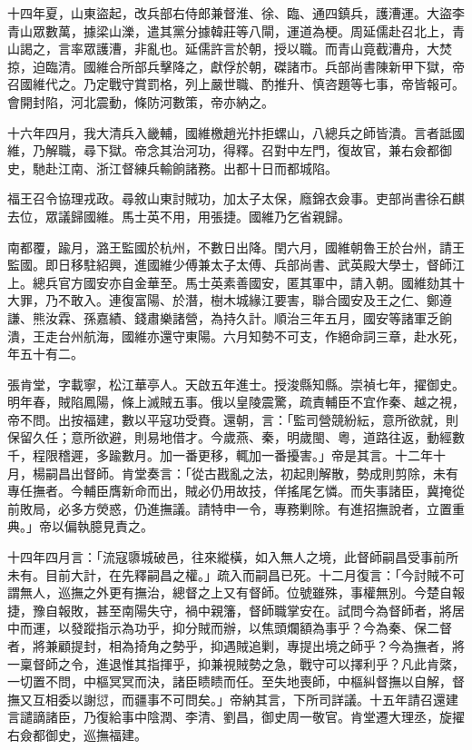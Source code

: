 \begin{pinyinscope}
十四年夏，山東盜起，改兵部右侍郎兼督淮、徐、臨、通四鎮兵，護漕運。大盜李青山眾數萬，據梁山濼，遣其黨分據韓莊等八閘，運道為梗。周延儒赴召北上，青山謁之，言率眾護漕，非亂也。延儒許言於朝，授以職。而青山竟截漕舟，大焚掠，迫臨清。國維合所部兵擊降之，獻俘於朝，磔諸市。兵部尚書陳新甲下獄，帝召國維代之。乃定戰守賞罰格，列上嚴世職、酌推升、慎咨題等七事，帝皆報可。會開封陷，河北震動，條防河數策，帝亦納之。

十六年四月，我大清兵入畿輔，國維檄趙光抃拒螺山，八總兵之師皆潰。言者詆國維，乃解職，尋下獄。帝念其治河功，得釋。召對中左門，復故官，兼右僉都御史，馳赴江南、浙江督練兵輸餉諸務。出都十日而都城陷。

福王召令協理戎政。尋敘山東討賊功，加太子太保，廕錦衣僉事。吏部尚書徐石麒去位，眾議歸國維。馬士英不用，用張捷。國維乃乞省親歸。

南都覆，踰月，潞王監國於杭州，不數日出降。閏六月，國維朝魯王於台州，請王監國。即日移駐紹興，進國維少傅兼太子太傅、兵部尚書、武英殿大學士，督師江上。總兵官方國安亦自金華至。馬士英素善國安，匿其軍中，請入朝。國維劾其十大罪，乃不敢入。連復富陽、於潛，樹木城緣江要害，聯合國安及王之仁、鄭遵謙、熊汝霖、孫嘉績、錢肅樂諸營，為持久計。順治三年五月，國安等諸軍乏餉潰，王走台州航海，國維亦還守東陽。六月知勢不可支，作絕命詞三章，赴水死，年五十有二。

張肯堂，字載寧，松江華亭人。天啟五年進士。授浚縣知縣。崇禎七年，擢御史。明年春，賊陷鳳陽，條上滅賊五事。俄以皇陵震驚，疏責輔臣不宜作秦、越之視，帝不問。出按福建，數以平寇功受賚。還朝，言：「監司營競紛紜，意所欲就，則保留久任；意所欲避，則易地借才。今歲燕、秦，明歲閩、粵，道路往返，動經數千，程限稽遲，多踰數月。加一番更移，輒加一番擾害。」帝是其言。十二年十月，楊嗣昌出督師。肯堂奏言：「從古戡亂之法，初起則解散，勢成則剪除，未有專任撫者。今輔臣膺新命而出，賊必仍用故技，佯搖尾乞憐。而失事諸臣，冀掩從前敗局，必多方熒惑，仍進撫議。請特申一令，專務剿除。有進招撫說者，立置重典。」帝以偏執臆見責之。

十四年四月言：「流寇隳城破邑，往來縱橫，如入無人之境，此督師嗣昌受事前所未有。目前大計，在先釋嗣昌之權。」疏入而嗣昌已死。十二月復言：「今討賊不可謂無人，巡撫之外更有撫治，總督之上又有督師。位號雖殊，事權無別。今楚自報捷，豫自報敗，甚至南陽失守，禍中親籓，督師職掌安在。試問今為督師者，將居中而運，以發蹤指示為功乎，抑分賊而辦，以焦頭爛額為事乎？今為秦、保二督者，將兼顧提封，相為掎角之勢乎，抑遇賊追剿，專提出境之師乎？今為撫者，將一稟督師之令，進退惟其指揮乎，抑兼視賊勢之急，戰守可以擇利乎？凡此肯綮，一切置不問，中樞冥冥而決，諸臣瞆瞆而任。至失地喪師，中樞糾督撫以自解，督撫又互相委以謝愆，而疆事不可問矣。」帝納其言，下所司詳議。十五年請召還建言譴謫諸臣，乃復給事中陰潤、李清、劉昌，御史周一敬官。肯堂遷大理丞，旋擢右僉都御史，巡撫福建。


\end{pinyinscope}
